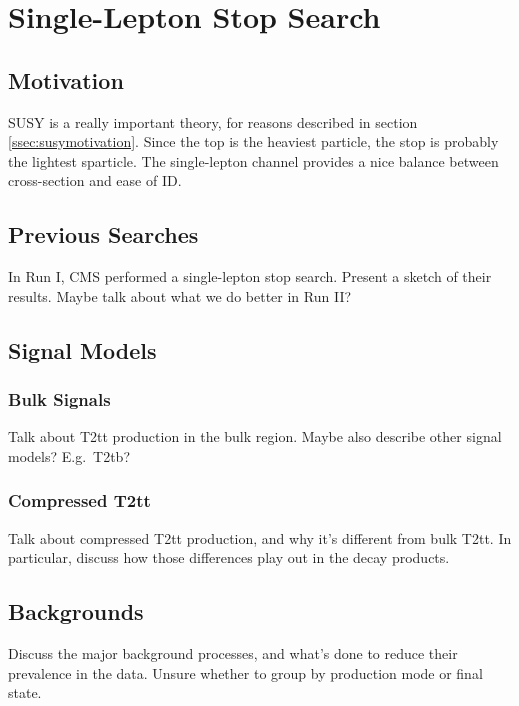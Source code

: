 \chapter{Single-Lepton Stop Search}
\label{chap:stop}

\section{Motivation}
\label{sec:stopmotivation}

SUSY is a really important theory, for reasons described in section \ref{ssec:susymotivation}.
Since the top is the heaviest particle, the stop is probably the lightest sparticle.
The single-lepton channel provides a nice balance between cross-section and ease of ID.

\section{Previous Searches}
\label{sec:stopprun1}

In Run I, CMS performed a single-lepton stop search.
Present a sketch of their results.
Maybe talk about what we do better in Run II?

\section{Signal Models}
\label{sec:stopsigmodels}

\subsection{Bulk Signals}
\label{ssec:stopsigbulk}

Talk about T2tt production in the bulk region.
Maybe also describe other signal models?
E.g.~T2tb?

\subsection{Compressed T2tt}
\label{ssec:stopsigcompressed}

Talk about compressed T2tt production, and why it's different from bulk T2tt.
In particular, discuss how those differences play out in the decay products.

\section{Backgrounds}
\label{sec:stopbkgs}

Discuss the major background processes, and what's done to
reduce their prevalence in the data.
Unsure whether to group by production mode or final state.

